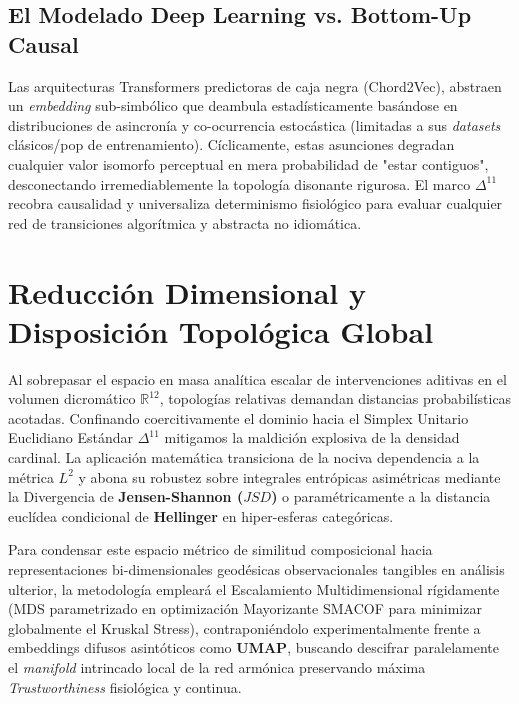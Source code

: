 \subsection{El Modelado Deep Learning vs. Bottom-Up Causal}
Las arquitecturas Transformers predictoras de caja negra (Chord2Vec), abstraen un \textit{embedding} sub-simbólico que deambula estadísticamente basándose en distribuciones de asincronía y co-ocurrencia estocástica (limitadas a sus \textit{datasets} clásicos/pop de entrenamiento). Cíclicamente, estas asunciones degradan cualquier valor isomorfo perceptual en mera probabilidad de "estar contiguos", desconectando irremediablemente la topología disonante rigurosa. El marco $\Delta^{11}$ recobra causalidad y universaliza determinismo fisiológico para evaluar cualquier red de transiciones algorítmica y abstracta no idiomática.

\section{Reducción Dimensional y Disposición Topológica Global}
\label{sec:reduccion_dimensional}
Al sobrepasar el espacio en masa analítica escalar de intervenciones aditivas en el volumen dicromático $\mathbb{R}^{12}$, topologías relativas demandan distancias probabilísticas acotadas. Confinando coercitivamente el dominio hacia el Simplex Unitario Euclidiano Estándar $\Delta^{11}$ mitigamos la maldición explosiva de la densidad cardinal. La aplicación matemática transiciona de la nociva dependencia a la métrica $L^2$ y abona su robustez sobre integrales entrópicas asimétricas mediante la Divergencia de \textbf{Jensen-Shannon ($JSD$)} o paramétricamente a la distancia euclídea condicional de \textbf{Hellinger} en hiper-esferas categóricas.

Para condensar este espacio métrico de similitud composicional hacia representaciones bi-dimensionales geodésicas observacionales tangibles en análisis ulterior, la metodología empleará el Escalamiento Multidimensional rígidamente (MDS parametrizado en optimización Mayorizante SMACOF para minimizar globalmente el Kruskal Stress), contraponiéndolo experimentalmente frente a embeddings difusos asintóticos como \textbf{UMAP}, buscando descifrar paralelamente el \textit{manifold} intrincado local de la red armónica preservando máxima \textit{Trustworthiness} fisiológica y continua.
